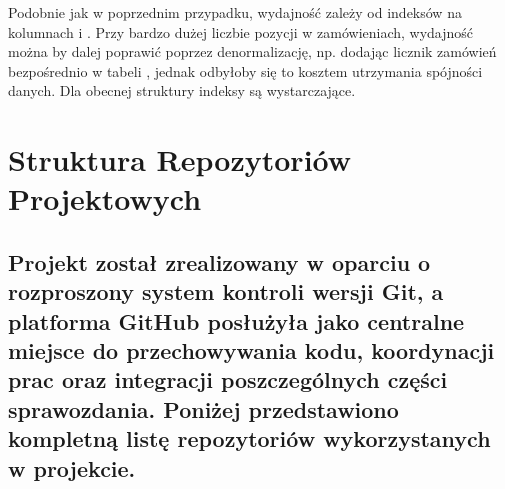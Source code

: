 \documentclass[a4paper,11pt,polish]{sphinxmanual}
\begin{document}
\begin{sphinxVerbatim}[commandchars=\\\{\}]
\end{sphinxVerbatim}

\sphinxAtStartPar
{} Podobnie jak w poprzednim przypadku, wydajność zależy od indeksów na kolumnach  i . Przy bardzo dużej liczbie pozycji w zamówieniach, wydajność można by dalej poprawić poprzez denormalizację, np. dodając licznik zamówień bezpośrednio w tabeli , jednak odbyłoby się to kosztem utrzymania spójności danych. Dla obecnej struktury indeksy są wystarczające.

\sphinxstepscope


\chapter{Struktura Repozytoriów Projektowych}
\label{\detokenize{rozdzial_5:struktura-repozytoriow-projektowych}}\label{\detokenize{rozdzial_5:rozdzial-5}}\label{\detokenize{rozdzial_5::doc}}

\section{Projekt został zrealizowany w oparciu o rozproszony system kontroli wersji Git, a platforma GitHub posłużyła jako centralne miejsce do przechowywania kodu, koordynacji prac oraz integracji poszczególnych części sprawozdania. Poniżej przedstawiono kompletną listę repozytoriów wykorzystanych w projekcie.}
\label{\detokenize{rozdzial_5:projekt-zostal-zrealizowany-w-oparciu-o-rozproszony-system-kontroli-wersji-git-a-platforma-github-posluzyla-jako-centralne-miejsce-do-przechowywania-kodu-koordynacji-prac-oraz-integracji-poszczegolnych-czesci-sprawozdania-ponizej-przedstawiono-kompletna-liste-repozytoriow-wykorzystanych-w-projekcie}}
\end{document}

